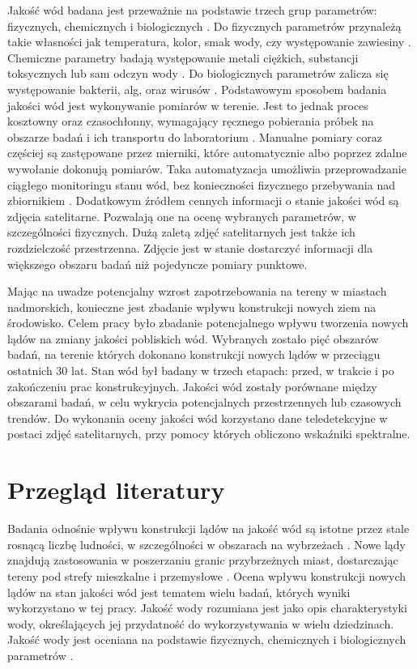 \documentclass{amuthesis}
\begin{document}
Jakość wód badana jest przeważnie na podstawie trzech grup parametrów:
fizycznych, chemicznych i biologicznych \autocite{summers2020water}. Do
fizycznych parametrów przynależą takie własności jak temperatura, kolor,
smak wody, czy występowanie zawiesiny \autocite{summers2020water}.
Chemiczne parametry badają występowanie metali ciężkich, substancji
toksycznych lub sam odczyn wody \autocite{summers2020water}. Do
biologicznych parametrów zalicza się występowanie bakterii, alg, oraz
wirusów \autocite{summers2020water}. Podstawowym sposobem badania
jakości wód jest wykonywanie pomiarów w terenie. Jest to jednak proces
kosztowny oraz czasochłonny, wymagający ręcznego pobierania próbek na
obszarze badań i ich transportu do laboratorium
\autocite{glasgow2004real}. Manualne pomiary coraz częściej są
zastępowane przez mierniki, które automatycznie albo poprzez zdalne
wywołanie dokonują pomiarów. Taka automatyzacja umożliwia
przeprowadzanie ciągłego monitoringu stanu wód, bez konieczności
fizycznego przebywania nad zbiornikiem \autocite{glasgow2004real}.
Dodatkowym źródłem cennych informacji o stanie jakości wód są zdjęcia
satelitarne. Pozwalają one na ocenę wybranych parametrów, w
szczególności fizycznych. Dużą zaletą zdjęć satelitarnych jest także ich
rozdzielczość przestrzenna. Zdjęcie jest w stanie dostarczyć informacji
dla większego obszaru badań niż pojedyncze pomiary punktowe.

Mając na uwadze potencjalny wzrost zapotrzebowania na tereny w miastach
nadmorskich, konieczne jest zbadanie wpływu konstrukcji nowych ziem na
środowisko. Celem pracy było zbadanie potencjalnego wpływu tworzenia
nowych lądów na zmiany jakości pobliskich wód. Wybranych zostało pięć
obszarów badań, na terenie których dokonano konstrukcji nowych lądów w
przeciągu ostatnich 30 lat. Stan wód był badany w trzech etapach: przed,
w trakcie i po zakończeniu prac konstrukcyjnych. Jakości wód zostały
porównane między obszarami badań, w celu wykrycia potencjalnych
przestrzennych lub czasowych trendów. Do wykonania oceny jakości wód
korzystano dane teledetekcyjne w postaci zdjęć satelitarnych, przy
pomocy których obliczono wskaźniki spektralne.


\hypertarget{sec-lit}{%
\chapter{Przegląd literatury}\label{sec-lit}}

Badania odnośnie wpływu konstrukcji lądów na jakość wód są istotne przez
stale rosnącą liczbę ludności, w szczególności w obszarach na wybrzeżach
\autocite{mcgranahan2007rising}. Nowe lądy znajdują zastosowania w
poszerzaniu granic przybrzeżnych miast, dostarczając tereny pod strefy
mieszkalne i przemysłowe \autocite{wang2014development}. Ocena wpływu
konstrukcji nowych lądów na stan jakości wód jest tematem wielu badań,
których wyniki wykorzystano w tej pracy. Jakość wody rozumiana jest jako
opis charakterystyki wody, określających jej przydatność do
wykorzystywania w wielu dziedzinach. Jakość wody jest oceniana na
podstawie fizycznych, chemicznych i biologicznych parametrów
\autocite{tyagi2013water}.
\end{document}

